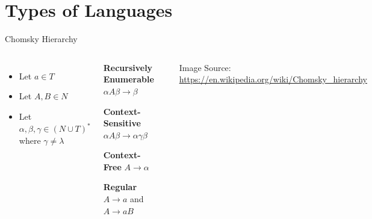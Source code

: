 \documentclass{beamer}
\begin{document}
\section{Types of Languages}

\begin{frame}{Chomsky Hierarchy}
\begin{columns}
    \begin{itemize}[<+->]
        \item Let $a \in T$
        \item Let $A,B \in N$
        \item Let $\alpha, \beta, \gamma \in (N \cup T)^*$ where
        $\gamma \neq \lambda$
    \end{itemize}

    \begin{description}[<+->]
        \item[Type-0] \textbf{Recursively Enumerable} 
            \newline$\alpha A \beta \rightarrow \beta$
        \item[Type-1] \textbf{Context-Sensitive}
            \newline$\alpha A \beta \rightarrow \alpha \gamma \beta$
        \item[Type-2] \textbf{Context-Free} 
            \newline$A \rightarrow \alpha$
        \item[Type-3] \textbf{Regular} 
            \newline$A \rightarrow a$ and $A \rightarrow aB$
    \end{description}
    \includegraphics[width=0.8\textwidth]{images/chomsky-hierarchy}
    \newline
    \begin{center}
        {\tiny Image Source: \url{https://en.wikipedia.org/wiki/Chomsky_hierarchy}}
    \end{center}
\end{columns}
\end{frame}
\end{document}
